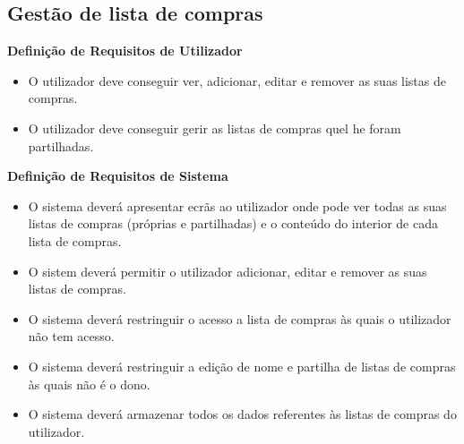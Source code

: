 \documentclass[a4paper]{report}
\begin{document}
        \subsection{Gestão de lista de compras}
            \textbf{Definição de Requisitos de Utilizador}
            \begin{itemize}
                \item O utilizador deve conseguir ver, adicionar, editar 
                e remover as suas listas de compras.
                \item O utilizador deve conseguir gerir as listas de compras 
                quel he foram partilhadas.
            \end{itemize}
            \textbf{Definição de Requisitos de Sistema}
            \begin{itemize}
                \item O sistema deverá apresentar ecrãs ao utilizador onde
                pode ver todas as suas listas de compras (próprias e 
                partilhadas) e o conteúdo do interior de cada lista de compras.
                \item O sistem deverá permitir o utilizador adicionar, editar e 
                remover as suas listas de compras.
                \item O sistema deverá restringuir o acesso a lista de compras
                às quais o utilizador não tem acesso.
                \item O sistema deverá restringuir a edição de nome e partilha
                de listas de compras às quais não é o dono.
                \item O sistema deverá armazenar todos os dados referentes às
                listas de compras do utilizador.
            \end{itemize}
\end{document}
